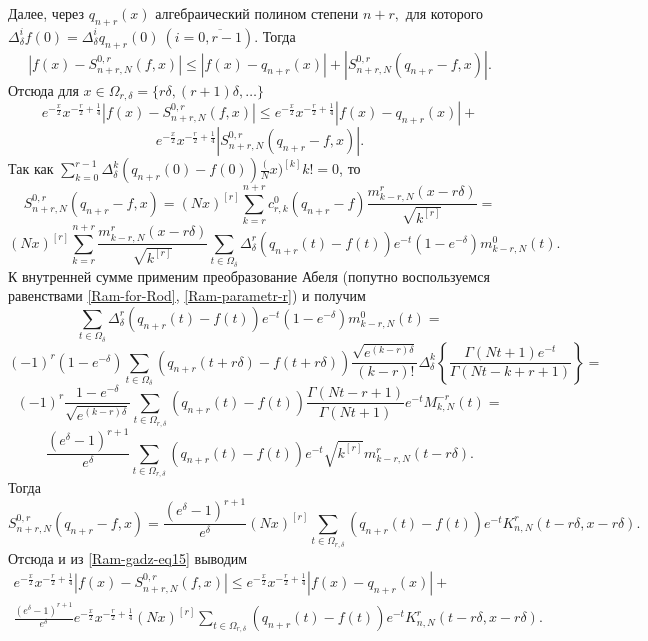 Далее, через $q_{n+r}(x)$ алгебраический полином степени $n+r,$ для которого
$
\Delta^i_\delta f(0)=\Delta^i_\delta q_{n+r}(0)\ (i=\overline{0, r-1}).
$
Тогда
$$
\left|f(x)-S_{n+r,N}^{0,r}(f,x)\right|\leq\left|f(x)-q_{n+r}(x)\right|+\left|S_{n+r,N}^{0,r}(q_{n+r}-f,x)\right|.
$$
Отсюда для $x\in\Omega_{r,\delta}=\{r\delta, (r+1)\delta, \ldots\}$
$$
e^{-{\frac{x}{2}}}x^{-{\frac{r}{2}}+{\frac{1}{4}}}\left|f(x)-S_{n+r,N}^{0,r}(f,x)\right|\leq e^{-{\frac{x}{2}}}x^{-{\frac{r}{2}}+{\frac{1}{4}}}\left|f(x)-q_{n+r}(x)\right|+
$$
\begin{equation}\label{Ram-gadz-eq15}
e^{-{\frac{x}{2}}}x^{-{\frac{r}{2}}+{\frac{1}{4}}}\left|S_{n+r,N}^{0,r}(q_{n+r}-f,x)\right|.
\end{equation}
Так как $\sum\limits_{k=0}^{r-1}\Delta_\delta^k(q_{n+r}(0)-f(0)){\frac(Nx)^{[k]}{k!}}=0$, то
$$
S_{n+r,N}^{0,r}(q_{n+r}-f,x)=
(Nx)^{[r]}\sum_{k=r}^{n+r}c_{r,k}^0(q_{n+r}-f) \frac{m^{r}_{k-r,N}(x-r\delta)}{\sqrt{k^{[r]}}}=
$$
$$
(Nx)^{[r]}\sum_{k=r}^{n+r}\frac{m^{r}_{k-r,N}(x-r\delta)}{\sqrt{k^{[r]}}}
\sum_{t\in\Omega_{\delta}}\Delta_\delta^r(q_{n+r}(t)-f(t))e^{-t}(1-e^{-\delta})m_{k-r,N}^0(t).
$$
К внутренней сумме применим преобразование Абеля (попутно воспользуемся равенствами \eqref{Ram-for-Rod}, \eqref{Ram-parametr-r}) и получим
$$
\sum_{t\in\Omega_{\delta}}\Delta_\delta^r(q_{n+r}(t)-f(t))e^{-t}(1-e^{-\delta})m_{k-r,N}^0(t)=
$$
$$
(-1)^r(1-e^{-\delta})\sum_{t\in\Omega_{\delta}}(q_{n+r}(t+r\delta)-f(t+r\delta))\frac{\sqrt{e^{(k-r)\delta}}}{(k-r)!}
\Delta_\delta^k\left\{\frac{\Gamma(Nt+1)e^{-t}}{\Gamma(Nt-k+r+1)}\right\}=
$$
$$
(-1)^r\frac{1-e^{-\delta}}{\sqrt{e^{(k-r)\delta}}}\sum_{t\in\Omega_{r,\delta}}(q_{n+r}(t)-f(t))\frac{\Gamma(Nt-r+1)}{\Gamma(Nt+1)}e^{-t}M_{k,N}^{-r}(t)=
$$
$$
\frac{(e^{\delta}-1)^{r+1}}{e^\delta}\sum_{t\in\Omega_{r,\delta}}(q_{n+r}(t)-f(t))e^{-t}\sqrt{k^{[r]}}m_{k-r,N}^{r}(t-r\delta).
$$
Тогда
$$
S_{n+r,N}^{0,r}(q_{n+r}-f,x)=\frac{(e^{\delta}-1)^{r+1}}{e^\delta}(Nx)^{[r]}\sum_{t\in\Omega_{r,\delta}}(q_{n+r}(t)-f(t))e^{-t}K_{n,N}^r(t-r\delta,x-r\delta).
$$
Отсюда и из \eqref{Ram-gadz-eq15} выводим
\begin{multline}\label{Ram-gadz-eq16}
e^{-{\frac{x}{2}}}x^{-{\frac{r}{2}}+{\frac{1}{4}}}\left|f(x)-S_{n+r,N}^{0,r}(f,x)\right|\leq e^{-{\frac{x}{2}}}x^{-{\frac{r}{2}}+{\frac{1}{4}}}\left|f(x)-q_{n+r}(x)\right|+\\
\frac{(e^{\delta}-1)^{r+1}}{e^\delta}e^{-{\frac{x}{2}}}x^{-{\frac{r}{2}}+{\frac{1}{4}}}(Nx)^{[r]}\sum_{t\in\Omega_{r,\delta}}(q_{n+r}(t)-f(t))e^{-t}K_{n,N}^r(t-r\delta,x-r\delta).
\end{multline}

